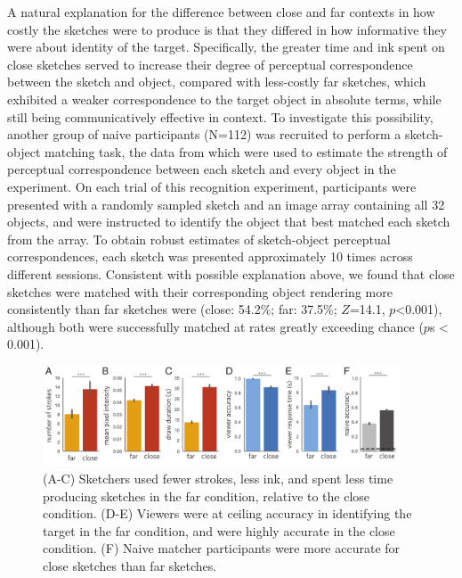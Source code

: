 \documentclass[9pt,twocolumn,twoside]{pnas-new}
\begin{document}
A natural explanation for the difference between close and far contexts in how costly the sketches were to produce is that they differed in how informative they were about identity of the target. Specifically, the greater time and ink spent on close sketches served to increase their degree of perceptual correspondence between the sketch and object, compared with less-costly far sketches, which exhibited a weaker correspondence to the target object in absolute terms, while still being communicatively effective in context. 
To investigate this possibility, another group of naive participants (N=112) was recruited to perform a sketch-object matching task, the data from which were used to estimate the strength of perceptual correspondence between each sketch and every object in the experiment. 
On each trial of this recognition experiment, participants were presented with a randomly sampled sketch and an image array containing all 32 objects, and were instructed to identify the object that best matched each sketch from the array. 
To obtain robust estimates of sketch-object perceptual correspondences, each sketch was presented approximately 10 times across different sessions. 
Consistent with possible explanation above, we found that close sketches were matched with their corresponding object rendering more consistently than far sketches were (close: 54.2\%; far: 37.5\%; $Z$=14.1, $p$<0.001), although both were successfully matched at rates greatly exceeding chance ($p$s < 0.001).

\begin{figure}[htbp]
\centering
\includegraphics[width=0.95\textwidth]{figures/3_behavioral_performance.pdf}
\caption{(A-C) Sketchers used fewer strokes, less ink, and spent less time producing sketches in the far condition, relative to the close condition. (D-E) Viewers were at ceiling accuracy in identifying the target in the far condition, and were highly accurate in the close condition. (F) Naive matcher participants were more accurate for close sketches than far sketches.}
\label{task_performance}
\end{figure}

\end{document}
